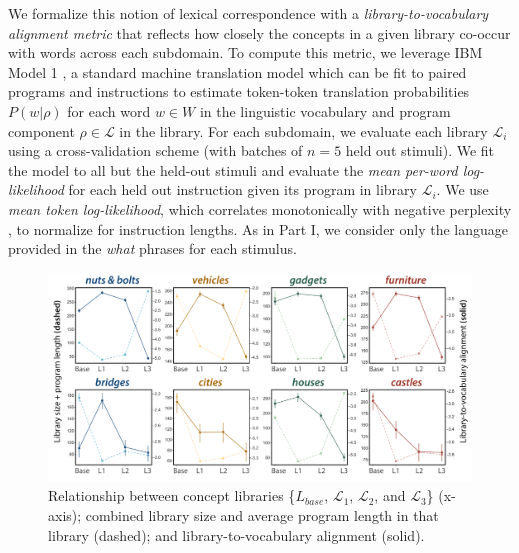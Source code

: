 We formalize this notion of lexical correspondence with a \textit{library-to-vocabulary alignment metric} that reflects how closely the concepts in a given library co-occur with words across each subdomain. 
To compute this metric, we leverage IBM Model 1 , a standard machine translation model which can be fit to paired programs and instructions to estimate token-token translation probabilities $P(w|\rho)$ for each word $w \in W$ in the linguistic vocabulary and program component $\rho \in \mathcal{L}$ in the library. 
For each subdomain, we evaluate each library $\mathcal{L}_i$ using a cross-validation scheme (with batches of $n=5$ held out stimuli). 
We fit the model to all but the held-out stimuli and evaluate the \textit{mean per-word log-likelihood} for each held out instruction given its program in library $\mathcal{L}_i$. 
We use \textit{mean token log-likelihood}, which correlates monotonically with negative {perplexity} , to normalize for instruction lengths. As in Part I, we consider only the language provided in the \textit{what} phrases for each stimulus.



\begin{figure}[ht!]
  \begin{center}
  \includegraphics[width=0.99\linewidth]{figures/lax_library_costs.pdf}
  \caption{Relationship between concept libraries \{$L_{base}$, $\mathcal{L}_1$, $\mathcal{L}_2$, and $\mathcal{L}_3$\} (x-axis); combined library size and average program length in that library (dashed); and library-to-vocabulary alignment (solid).}\label{fig:perplexity-length}
  \end{center}
\end{figure}

